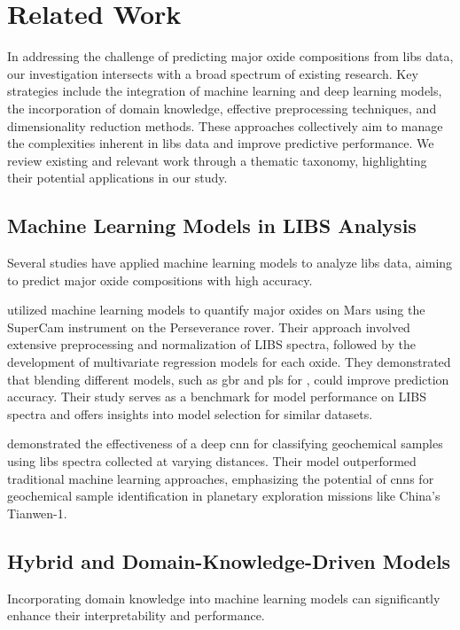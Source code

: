 \section{Related Work}\label{sec:related-work}
In addressing the challenge of predicting major oxide compositions from \gls{libs} data, our investigation intersects with a broad spectrum of existing research.
Key strategies include the integration of machine learning and deep learning models, the incorporation of domain knowledge, effective preprocessing techniques, and dimensionality reduction methods.
These approaches collectively aim to manage the complexities inherent in \gls{libs} data and improve predictive performance.
We review existing and relevant work through a thematic taxonomy, highlighting their potential applications in our study.

\subsection{Machine Learning Models in LIBS Analysis}
Several studies have applied machine learning models to analyze \gls{libs} data, aiming to predict major oxide compositions with high accuracy.

\citet{andersonPostlandingMajorElement2022} utilized machine learning models to quantify major oxides on Mars using the SuperCam instrument on the Perseverance rover.
Their approach involved extensive preprocessing and normalization of LIBS spectra, followed by the development of multivariate regression models for each oxide.
They demonstrated that blending different models, such as \gls{gbr} and \gls{pls} for , could improve prediction accuracy.
Their study serves as a benchmark for model performance on LIBS spectra and offers insights into model selection for similar datasets.

\citet{yangConvolutionalNeuralNetwork2022} demonstrated the effectiveness of a deep \gls{cnn} for classifying geochemical samples using \gls{libs} spectra collected at varying distances.
Their model outperformed traditional machine learning approaches, emphasizing the potential of \gls{cnn}s for geochemical sample identification in planetary exploration missions like China's Tianwen-1.

\subsection{Hybrid and Domain-Knowledge-Driven Models}
Incorporating domain knowledge into machine learning models can significantly enhance their interpretability and performance.

